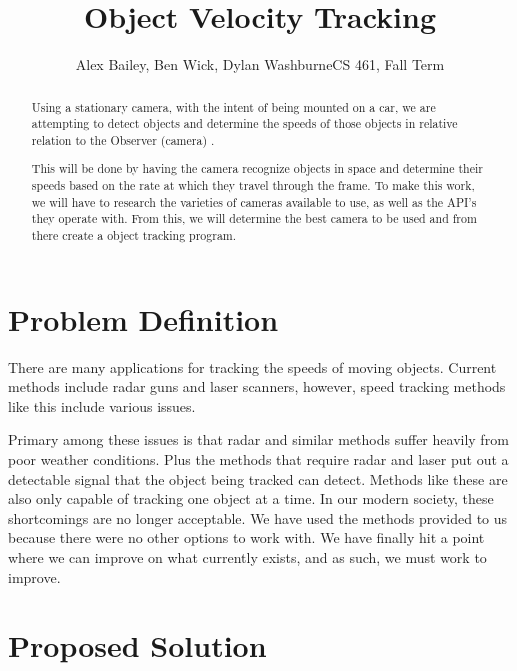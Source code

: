 \documentclass[letterpaper,10pt,onecolumn,draftclsnofoot]{IEEEtran}
\title{Object Velocity Tracking}
\author{Alex Bailey, Ben Wick, Dylan WashburneCS 461, Fall Term}
\begin{document}
\begin{titlepage}

\maketitle

\begin{abstract}
Using a stationary camera, with the intent of being mounted on a car, we are attempting to  detect objects and determine the speeds of those objects in relative relation to the Observer (camera) .

This will be done by having the camera recognize objects in space and determine their speeds based on the rate at which they travel through the frame.
 To make this work, we will have to research the varieties of cameras available to use, as well as the API’s  they operate with.
 From this, we will determine the best camera to be used and from there create a object tracking program.
 
\end{abstract}

\end{titlepage}

\section{Problem Definition}

There are many applications for tracking the speeds of moving objects.
 Current methods include radar guns and laser scanners, however, speed tracking methods like this include various issues.

 Primary among these issues is that radar and similar methods suffer heavily from poor weather conditions.
 Plus the methods that require radar and laser put out a detectable signal that the object being tracked can detect.
  Methods like these are also only capable of tracking one object at a time.
 In our modern society, these shortcomings are no longer acceptable.
 We have used the methods provided to us because there were no other options to work with.
 We have finally hit a point where we can improve on what currently exists, and as such, we must work to improve. 


\section{Proposed Solution}
\end{document}
